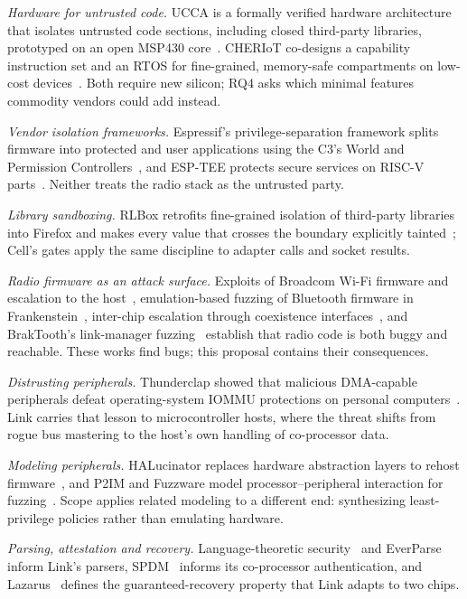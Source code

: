 \documentclass[conference,10pt]{IEEEtran}
\begin{document}
\emph{Hardware for untrusted code.} UCCA is a formally verified hardware architecture that isolates untrusted code sections, including closed third-party libraries, prototyped on an open MSP430 core~\cite{tyler2024ucca}. CHERIoT co-designs a capability instruction set and an RTOS for fine-grained, memory-safe compartments on low-cost devices~\cite{amar2023cheriot,amar2025cheriotrtos}. Both require new silicon; RQ4 asks which minimal features commodity vendors could add instead.

\emph{Vendor isolation frameworks.} Espressif's privilege-separation framework splits firmware into protected and user applications using the C3's World and Permission Controllers~\cite{parekhprivsep}, and ESP-TEE protects secure services on RISC-V parts~\cite{esptee}. Neither treats the radio stack as the untrusted party.

\emph{Library sandboxing.} RLBox retrofits fine-grained isolation of third-party libraries into Firefox and makes every value that crosses the boundary explicitly tainted~\cite{narayan2020rlbox}; Cell's gates apply the same discipline to adapter calls and socket results.

\emph{Radio firmware as an attack surface.} Exploits of Broadcom Wi-Fi firmware and escalation to the host~\cite{artenstein2017broadpwn,beniamini2017overtheair}, emulation-based fuzzing of Bluetooth firmware in Frankenstein~\cite{ruge2020frankenstein}, inter-chip escalation through coexistence interfaces~\cite{classen2022spectra}, and BrakTooth's link-manager fuzzing~\cite{garbelini2022braktooth} establish that radio code is both buggy and reachable. These works find bugs; this proposal contains their consequences.

\emph{Distrusting peripherals.} Thunderclap showed that malicious DMA-capable peripherals defeat operating-system IOMMU protections on personal computers~\cite{markettos2019thunderclap}. Link carries that lesson to microcontroller hosts, where the threat shifts from rogue bus mastering to the host's own handling of co-processor data.

\emph{Modeling peripherals.} HALucinator replaces hardware abstraction layers to rehost firmware~\cite{clements2020halucinator}, and P2IM and Fuzzware model processor--peripheral interaction for fuzzing~\cite{feng2020p2im,scharnowski2022fuzzware}. Scope applies related modeling to a different end: synthesizing least-privilege policies rather than emulating hardware.

\emph{Parsing, attestation and recovery.} Language-theoretic security~\cite{sassaman2011halting} and EverParse~\cite{ramananandro2019everparse,swamy2022everparse3d} inform Link's parsers, SPDM~\cite{dmtf2023spdm} informs its co-processor authentication, and Lazarus~\cite{huber2020lazarus} defines the guaranteed-recovery property that Link adapts to two chips.
\end{document}
